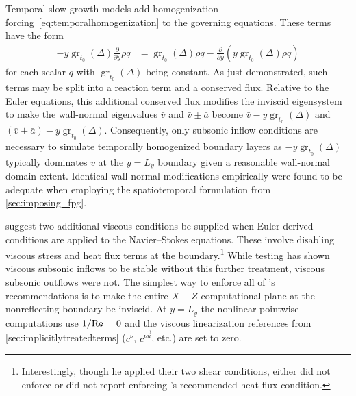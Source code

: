 Temporal slow growth models add homogenization
forcing~\eqref{eq:temporalhomogenization} to the governing equations.  These
terms have the form
\begin{align}
    -y \operatorname{gr}_{t_0}\!\left(\Delta\right)
    \frac{\partial\!}{\partial\!y} \rho q
    &=
    \operatorname{gr}_{t_0}\!\left(\Delta\right) \rho q
    -
    \frac{\partial\!}{\partial\!y}
    \left( y \operatorname{gr}_{t_0}\!\left(\Delta\right) \rho q \right)
\end{align}
for each scalar $q$ with $\operatorname{gr}_{t_0}\!\left(\Delta\right)$ being
constant.  As just demonstrated, such terms may be split into a reaction term and a
conserved flux.  Relative to the Euler equations, this additional conserved flux
modifies the inviscid eigensystem to make the wall-normal eigenvalues $\bar{v}$
and $\bar{v}\pm\bar{a}$ become $\bar{v} - y
\operatorname{gr}_{t_0}\!\left(\Delta\right)$ and
$\left(\bar{v}\pm\bar{a}\right) - y
\operatorname{gr}_{t_0}\!\left(\Delta\right)$.  Consequently, only subsonic
inflow conditions are necessary to simulate temporally homogenized boundary
layers as $-y \operatorname{gr}_{t_0}\!\left(\Delta\right)$ typically dominates $\bar{v}$
at the $y=L_y$ boundary given a reasonable wall-normal domain extent.  Identical
wall-normal modifications empirically were found to be adequate when employing
the spatiotemporal formulation from \autoref{sec:imposing_fpg}.

\citet{Poinsot1992Boundary} suggest two additional viscous conditions be
supplied when Euler-derived conditions are applied to the Navier--Stokes
equations.  These involve disabling viscous stress and heat flux terms at the
boundary.\footnote{%
    Interestingly, though he applied their two shear conditions,
    \citet{Guarini1998} either did not enforce or did not report enforcing
    \citeauthor{Poinsot1992Boundary}'s recommended heat flux condition.
}
While testing has shown viscous subsonic inflows to be stable without this
further treatment, viscous subsonic outflows were not.  The simplest way to
enforce all of \citeauthor{Poinsot1992Boundary}'s recommendations is to make the
entire $X-Z$ computational plane at the nonreflecting boundary be inviscid.  At
$y=L_y$ the nonlinear pointwise computations use $1/\mbox{Re}_{}=0$ and the viscous
linearization references from \autoref{sec:implicitlytreatedterms} ($c^\nu$,
$\overrightarrow{c^{\nu{}u}}$, etc.) are set to zero.



